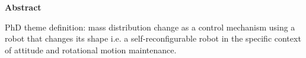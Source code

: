 \begin{center}
\LARGE\textbf {Abstract}
\end{center}
\vspace{1cm}

\begin{spacing}{1} 
\noindent
PhD theme definition: mass distribution change as a control mechanism using a robot that changes its shape i.e. a self-reconfigurable robot in the specific context of attitude and rotational motion maintenance.


\end{spacing}